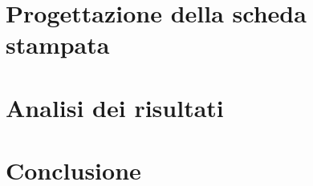 \documentclass[12pt]{article}
\begin{document}
\section{Progettazione della scheda stampata}
\section{Analisi dei risultati}


\section{Conclusione}
\end{document}
